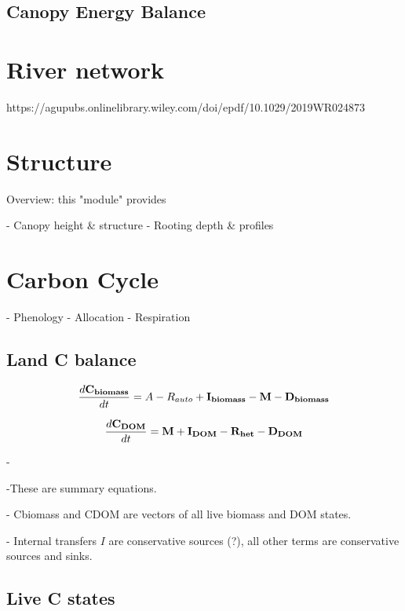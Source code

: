 \documentclass[twoside,10pt]{report}
\begin{document}
\section{Canopy Energy Balance}





\chapter{River network}
https://agupubs.onlinelibrary.wiley.com/doi/epdf/10.1029/2019WR024873




\chapter{Structure}

Overview: this "module" provides  

- Canopy height & structure
- Rooting depth & profiles


\chapter{Carbon Cycle}

- Phenology
- Allocation
- Respiration

\section{Land C balance}
\begin{equation}
\frac{d\bf{C_{biomass}}}{dt} = A - R_{auto} + \bf{I_{biomass}} - \bf{M} - \bf{D_{biomass}}
\end{equation}

\begin{equation}
\frac{d\bf{C_{DOM}}}{dt} = \bf{M} + \bf{I_{DOM}} -  \bf{R_{het}} - \bf{D_{DOM}}
\end{equation}

-

-These are summary equations.

- Cbiomass and CDOM are vectors of all live biomass and DOM states. 

- Internal transfers $I$ are conservative sources (?), all other terms are  conservative sources and sinks.


\section{Live C states}
\end{document}
